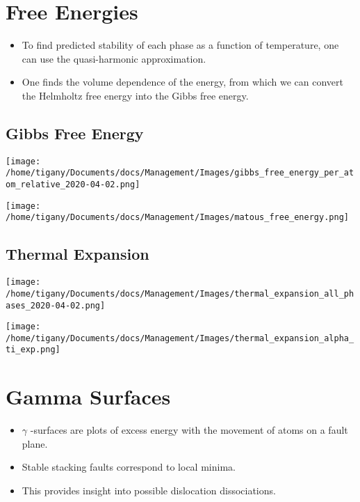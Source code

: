 \documentclass[11pt]{article}
\begin{document}
\section*{Free Energies}
\label{sec:org0e50e59}
\begin{itemize}
\item To find predicted stability of each phase as a function of temperature, one can
use the quasi-harmonic approximation.
\item One finds the volume dependence of the energy, from which we can convert the
Helmholtz free energy into the Gibbs free energy.
\end{itemize}

\subsection*{Gibbs Free Energy}
\label{sec:orgb1e2bcb}
\begin{center}
\texttt{[image: /home/tigany/Documents/docs/Management/Images/gibbs\_free\_energy\_per\_atom\_relative\_2020-04-02.png]}
\label{org3efeb64}
\end{center}

\begin{center}
\texttt{[image: /home/tigany/Documents/docs/Management/Images/matous\_free\_energy.png]}
\end{center}


\subsection*{Thermal Expansion}
\label{sec:org1d3de11}
\begin{center}
\texttt{[image: /home/tigany/Documents/docs/Management/Images/thermal\_expansion\_all\_phases\_2020-04-02.png]}
\label{orgb2880f4}
\end{center}


\begin{center}
\texttt{[image: /home/tigany/Documents/docs/Management/Images/thermal\_expansion\_alpha\_ti\_exp.png]}
\end{center}





\section*{Gamma Surfaces}
\label{sec:orgfc224da}


\begin{itemize}
\item \(\gamma\) -surfaces are plots of excess energy with the movement of
atoms on a fault plane.
\item Stable stacking faults correspond to local minima.
\item This provides insight into possible dislocation dissociations.
\end{itemize}
\end{document}
